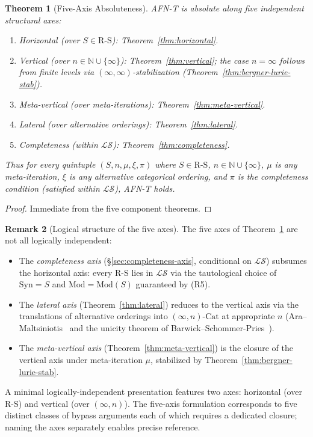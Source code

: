 \documentclass[11pt]{article}
\theoremstyle{plain}
\newtheorem{theorem}{Theorem}[section]
\theoremstyle{definition}
\newtheorem{remark}[theorem]{Remark}
\newcommand{\RS}{\mathrm{R\text{-}S}}
\newcommand{\cS}{\mathcal{S}}
\newcommand{\cL}{\mathcal{L}}
\newcommand{\Cat}{\mathrm{Cat}}
\newcommand{\Syn}{\mathrm{Syn}}
\newcommand{\Mod}{\mathrm{Mod}}
\begin{document}
\begin{theorem}[Five-Axis Absoluteness]\label{thm:five-axis}
AFN-T is absolute along five independent structural axes:
\begin{enumerate}
\item Horizontal (over $S \in \RS$): Theorem~\ref{thm:horizontal}.
\item Vertical (over $n \in \mathbb{N} \cup \{\infty\}$): Theorem~\ref{thm:vertical}; the case $n = \infty$ follows from finite levels via $(\infty, \infty)$-stabilization (Theorem~\ref{thm:bergner-lurie-stab}).
\item Meta-vertical (over meta-iterations): Theorem~\ref{thm:meta-vertical}.
\item Lateral (over alternative orderings): Theorem~\ref{thm:lateral}.
\item Completeness (within $\cL\cS$): Theorem~\ref{thm:completeness}.
\end{enumerate}
Thus for every quintuple $(S, n, \mu, \xi, \pi)$ where $S \in \RS$, $n \in \mathbb{N} \cup \{\infty\}$, $\mu$ is any meta-iteration, $\xi$ is any alternative categorical ordering, and $\pi$ is the completeness condition (satisfied within $\cL\cS$), AFN-T holds.
\end{theorem}

\begin{proof}
Immediate from the five component theorems.
\end{proof}

\begin{remark}[Logical structure of the five axes]\label{rem:axes-dependence}
The five axes of Theorem~\ref{thm:five-axis} are not all logically independent:
\begin{itemize}
\item The \emph{completeness axis} (\S\ref{sec:completeness-axis}, conditional on $\cL\cS$) subsumes the horizontal axis: every R-S lies in $\cL\cS$ via the tautological choice of $\Syn = S$ and $\Mod = \Mod(S)$ guaranteed by (R5).
\item The \emph{lateral axis} (Theorem~\ref{thm:lateral}) reduces to the vertical axis via the translations of alternative orderings into $(\infty, n)$-$\Cat$ at appropriate $n$ (Ara--Maltsiniotis~\cite{AraMaltsiniotis2017} and the unicity theorem of Barwick--Schommer-Pries~\cite{BarwickSchommerPries2021}).
\item The \emph{meta-vertical axis} (Theorem~\ref{thm:meta-vertical}) is the closure of the vertical axis under meta-iteration $\mu$, stabilized by Theorem~\ref{thm:bergner-lurie-stab}.
\end{itemize}
A minimal logically-independent presentation features two axes: horizontal (over R-S) and vertical (over $(\infty, n)$). The five-axis formulation corresponds to five distinct classes of bypass arguments each of which requires a dedicated closure; naming the axes separately enables precise reference.
\end{remark}
\end{document}
